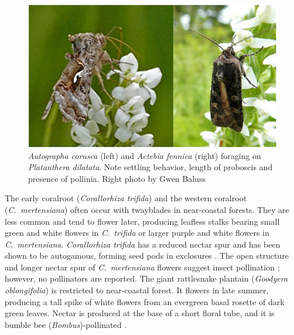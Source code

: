 \begin{multicols}{2}
\begin{figure}[H]
\begin{center}
\vspace{2mm}
\includegraphics[width=\textwidth]{img/Platanthera_dilatata_Noctuidae.jpg}
\caption{\emph{Autographa corusca} (left) and \emph{Actebia fennica} (right) foraging on \emph{Platanthera dilatata}. Note settling behavior, length of proboscis and presence of pollinia. Right photo by Gwen Baluss}
\label{Platanthera_dilatata_Noctuidae}
\end{center}
\end{figure}

The early coralroot (\emph{Corallorhiza trifida}) and the western
coralroot (\emph{C.\ mertensiana}) often occur with twayblades in
near-coastal forests. They are less common and tend to flower later,
producing leafless stalks bearing small green and white flowers in
\emph{C.\ trifida} or larger purple and white flowers in \emph{C.\
mertensiana}. \emph{Corallorhiza trifida} has a reduced nectar spur and
has been shown to be autogamous, forming seed pods in exclosures
\citep{Catling1983}. The open structure and longer nectar spur of \emph{C.\
mertensiana} flowers suggest insect pollination \citep{Freudenstein1997};
however, no pollinators are reported. The giant rattlesnake plantain
(\emph{Goodyera oblongifolia}) is restricted to near-coastal forest. It
flowers in late summer, producing a tall spike of white flowers from an
evergreen basal rosette of dark green leaves. Nectar is produced at the
base of a short floral tube, and it is bumble bee
(\emph{Bombus})-pollinated \citep{Ackerman1975}.




\end{multicols}

